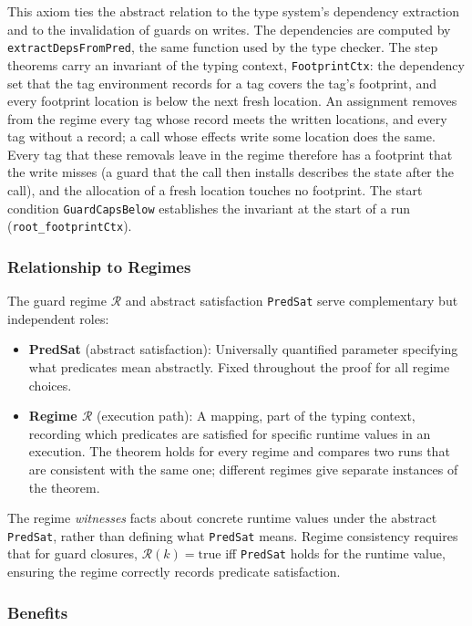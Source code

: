 \documentclass[12pt]{article}
\begin{document}
This axiom ties the abstract relation to the type system's dependency
extraction and to the invalidation of guards on writes.  The dependencies are
computed by \texttt{extractDepsFromPred}, the same function used by the type
checker.  The step theorems carry an invariant of the typing context,
\texttt{FootprintCtx}: the dependency set that the tag environment records for
a tag covers the tag's footprint, and every footprint location is below the
next fresh location.  An assignment removes from the regime every tag whose
record meets the written locations, and every tag without a record; a call
whose effects write some location does the same.  Every tag that these
removals leave in the regime therefore has a footprint that the write misses
(a guard that the call then installs describes the state after the call), and
the allocation of a fresh location touches no footprint.  The start condition
\texttt{GuardCapsBelow} establishes the invariant at the start of a run
(\texttt{root\_footprintCtx}).

\subsubsection{Relationship to Regimes}

The guard regime $\mathcal{R}$ and abstract satisfaction \texttt{PredSat} serve complementary but independent roles:

\begin{itemize}
    \item \textbf{PredSat} (abstract satisfaction): Universally quantified parameter specifying what predicates mean abstractly. Fixed throughout the proof for all regime choices.
    \item \textbf{Regime $\mathcal{R}$} (execution path): A mapping, part of the typing context, recording which predicates are satisfied for specific runtime values in an execution. The theorem holds for every regime and compares two runs that are consistent with the same one; different regimes give separate instances of the theorem.
\end{itemize}

The regime \emph{witnesses} facts about concrete runtime values under the
abstract \texttt{PredSat}, rather than defining what \texttt{PredSat} means.
Regime consistency requires that for guard closures, $\mathcal{R}(k) = \text{true}$ iff
\texttt{PredSat} holds for the runtime value, ensuring the regime correctly
records predicate satisfaction.

\subsubsection{Benefits}
\end{document}
